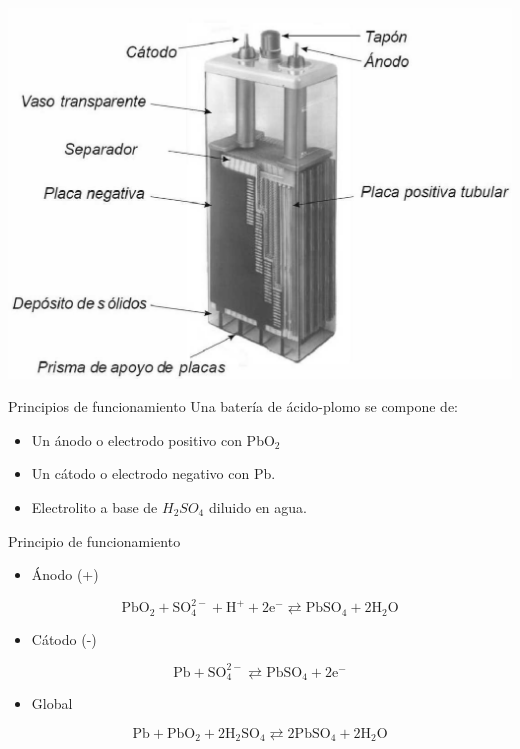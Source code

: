 \documentclass[xcolor={usenames,svgnames,dvipsnames}]{beamer}
\begin{document}
\begin{frame}[label=sec-2-2-1]{}
\includegraphics[width=.9\linewidth]{../figs/AcumuladorBN.pdf}
\end{frame}

\begin{frame}[label=sec-2-2-2]{Principios de funcionamiento}
Una batería de ácido-plomo se compone de:

\begin{itemize}
\item Un \alert{ánodo o electrodo positivo} con PbO$_{\text{2}}$

\item Un \alert{cátodo o electrodo negativo} con Pb.

\item \alert{Electrolito} a base de $H_{2}SO_{4}$ diluido en agua.
\end{itemize}
\end{frame}


\begin{frame}[label=sec-2-2-3]{Principio de funcionamiento}
\begin{itemize}
\item Ánodo (+)
\end{itemize}
$$\mathrm{PbO_{2}+SO_{4}^{2-}+H^{+}+2e^{-}\rightleftarrows PbSO_{4}+2H_{2}O}$$

\begin{itemize}
\item Cátodo (-)
\end{itemize}
$$\mathrm{Pb+SO_{4}^{2-}\rightleftarrows PbSO_{4}+2e^{-}}$$

\begin{itemize}
\item Global
\end{itemize}
$$\mathrm{Pb+PbO_{2}+2H_{2}SO_{4}\rightleftarrows2PbSO_{4}+2H_{2}O}$$
\end{frame}
\end{document}
